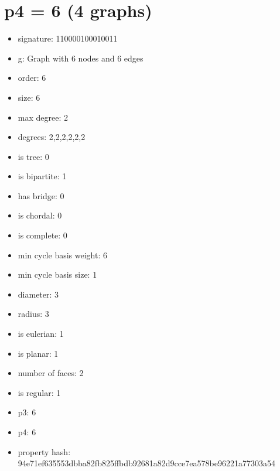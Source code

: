 \chapter{p4 = 6 (4 graphs)}
\newpage\begin{figure}
\end{figure}
\begin{itemize}
\item signature: 110000100010011
\item g: Graph with 6 nodes and 6 edges
\item order: 6
\item size: 6
\item max degree: 2
\item degrees: 2,2,2,2,2,2
\item is tree: 0
\item is bipartite: 1
\item has bridge: 0
\item is chordal: 0
\item is complete: 0
\item min cycle basis weight: 6
\item min cycle basis size: 1
\item diameter: 3
\item radius: 3
\item is eulerian: 1
\item is planar: 1
\item number of faces: 2
\item is regular: 1
\item p3: 6
\item p4: 6
\item property hash: 94e71ef635553dbba82fb825ffbdb92681a82d9cce7ea578be96221a77303a54
\end{itemize}
\newpage
\begin{figure}
\end{figure}
